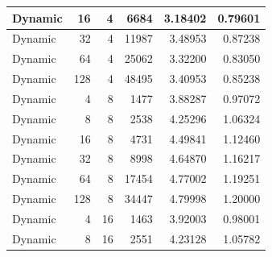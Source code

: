 \documentclass[journal,transmag]{IEEEtran}
\begin{document}
\begin{table}[h!]
\begin{tabular}{|l|r|r|r|r|r|}
		Dynamic       & 16                           & 4                            & 6684                              & 3.18402                       & 0.79601                         \\ \hline
		Dynamic       & 32                           & 4                            & 11987                             & 3.48953                       & 0.87238                         \\ \hline
		Dynamic       & 64                           & 4                            & 25062                             & 3.32200                       & 0.83050                         \\ \hline
		Dynamic       & 128                          & 4                            & 48495                             & 3.40953                       & 0.85238                         \\ \hline
		Dynamic       & 4                            & 8                            & 1477                              & 3.88287                       & 0.97072                         \\ \hline
		Dynamic       & 8                            & 8                            & 2538                              & 4.25296                       & 1.06324                         \\ \hline
		Dynamic       & 16                           & 8                            & 4731                              & 4.49841                       & 1.12460                         \\ \hline
		Dynamic       & 32                           & 8                            & 8998                              & 4.64870                       & 1.16217                         \\ \hline
		Dynamic       & 64                           & 8                            & 17454                             & 4.77002                       & 1.19251                         \\ \hline
		Dynamic       & 128                          & 8                            & 34447                             & 4.79998                       & 1.20000                         \\ \hline
		Dynamic       & 4                            & 16                           & 1463                              & 3.92003                       & 0.98001                         \\ \hline
		Dynamic       & 8                            & 16                           & 2551                              & 4.23128                       & 1.05782                         \\ \hline

\end{tabular}
\end{table}
\end{document}
